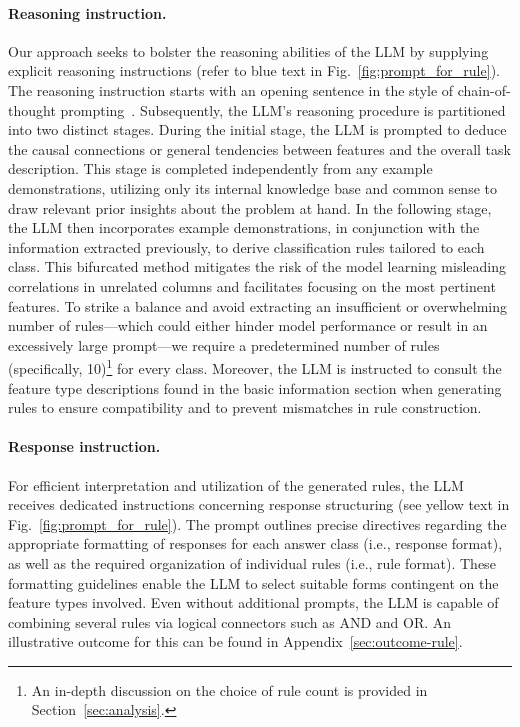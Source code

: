 \paragraph{Reasoning instruction.} Our approach seeks to bolster the reasoning abilities of the LLM by supplying explicit reasoning instructions (refer to blue text in Fig.~\ref{fig:prompt_for_rule}). The reasoning instruction starts with an opening sentence in the style of chain-of-thought prompting~\cite{wei2022chain}. Subsequently, the LLM's reasoning procedure is partitioned into two distinct stages. During the initial stage, the LLM is prompted to deduce the causal connections or general tendencies between features and the overall task description. This stage is completed independently from any example demonstrations, utilizing only its internal knowledge base and common sense to draw relevant prior insights about the problem at hand. In the following stage, the LLM then incorporates example demonstrations, in conjunction with the information extracted previously, to derive classification rules tailored to each class. This bifurcated method mitigates the risk of the model learning misleading correlations in unrelated columns and facilitates focusing on the most pertinent features. To strike a balance and avoid extracting an insufficient or overwhelming number of rules—which could either hinder model performance or result in an excessively large prompt—we require a predetermined number of rules (specifically, 10)\footnote{An in-depth discussion on the choice of rule count is provided in Section~\ref{sec:analysis}.} for every class. Moreover, the LLM is instructed to consult the feature type descriptions found in the basic information section when generating rules to ensure compatibility and to prevent mismatches in rule construction.

\vspace*{-0.12in}
\paragraph{Response instruction.} For efficient interpretation and utilization of the generated rules, the LLM receives dedicated instructions concerning response structuring (see yellow text in Fig.~\ref{fig:prompt_for_rule}). The prompt outlines precise directives regarding the appropriate formatting of responses for each answer class (i.e., response format), as well as the required organization of individual rules (i.e., rule format). These formatting guidelines enable the LLM to select suitable forms contingent on the feature types involved. Even without additional prompts, the LLM is capable of combining several rules via logical connectors such as AND and OR. An illustrative outcome for this can be found in Appendix~\ref{sec:outcome-rule}.

